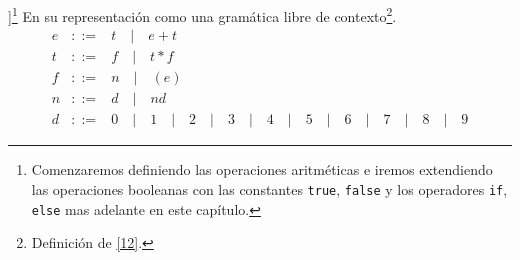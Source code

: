 \begin{definition}]\footnote{Comenzaremos definiendo las operaciones aritméticas e iremos extendiendo las operaciones booleanas con las constantes \texttt{true}, \texttt{false} y los operadores \texttt{if}, \texttt{else} mas adelante en este capítulo.}  En su representación como una gramática libre de contexto\footnote{Definición de \hyperlink{12}{[12]}.}.
    \[
    \begin{array}{rll}
        e & ::= & t \quad |\quad e + t \\
        t & ::= & f \quad |\quad t * f \\
        f & ::= & n \quad |\quad (e)\\
        n & ::= & d \quad |\quad nd \\
        d & ::= & 0 \quad |\quad 1 \quad |\quad 2 \quad |\quad 3 \quad |\quad 4 \quad |\quad 5 \quad |\quad 6 \quad |\quad 7 \quad |\quad 8 \quad |\quad 9 
    \end{array}
    \]

\end{definition}
    

     
